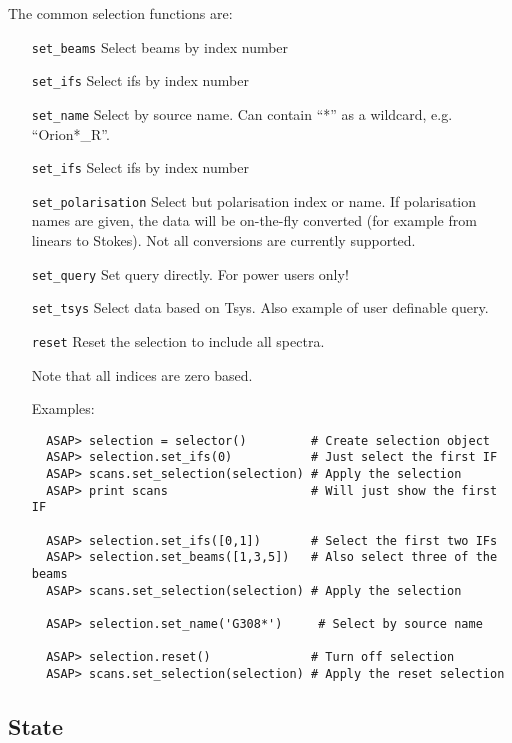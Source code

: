\documentclass[11pt]{article}
\newcommand{\cmd}[1]{{\tt #1}}
\begin{document}
The common selection functions are:

\begin{itemize}

\item[\cmd{set\_beams}] Select beams by index number
\item[\cmd{set\_ifs}] Select ifs by index number
\item[\cmd{set\_name}] Select by source name. Can contain ``*'' as a
wildcard, e.g. ``Orion*\_R''.
\item[\cmd{set\_ifs}] Select ifs by index number
\item[\cmd{set\_polarisation}] Select but polarisation index or
name. If polarisation names are given, the data will be on-the-fly
converted (for example from linears to Stokes). Not all conversions
are currently supported.
\item[\cmd{set\_query}] Set query directly. For power users only!
\item[\cmd{set\_tsys}] Select data based on Tsys. Also example of user
definable query.
\item[\cmd{reset}] Reset the selection to include all spectra.


Note that all indices are zero based.

Examples:

\begin{verbatim}
  ASAP> selection = selector()         # Create selection object
  ASAP> selection.set_ifs(0)           # Just select the first IF
  ASAP> scans.set_selection(selection) # Apply the selection
  ASAP> print scans                    # Will just show the first IF

  ASAP> selection.set_ifs([0,1])       # Select the first two IFs
  ASAP> selection.set_beams([1,3,5])   # Also select three of the beams
  ASAP> scans.set_selection(selection) # Apply the selection

  ASAP> selection.set_name('G308*')     # Select by source name

  ASAP> selection.reset()              # Turn off selection
  ASAP> scans.set_selection(selection) # Apply the reset selection

\end{verbatim}

\end{itemize}

\subsection{State}
\end{document}
